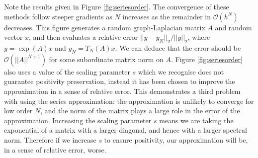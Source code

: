 Note the results given in Figure \ref{fig:seriesorder}. The convergence of these methods follow steeper gradients as $N$ increases as the remainder in $\mathcal{O}(h^N)$ decreases.
This figure generates a random graph-Laplacian matrix $A$ and random vector $x$, and then evaluates a relative error $||y-y_N||_2/||y||_2$,
where $y = \exp(A)x$ and $y_N = T_N(A)x$.
We can deduce that the error should be $\mathcal{O}(||A||^{N+1})$ for some subordinate matrix norm on $A$.
Figure \ref{fig:seriesorder} also uses a value of the scaling parameter $s$ which we recognise does not guarantee positivity preservation,
instead it has been chosen to improve the approximation in a sense of relative error.
This demonstrates a third problem with using the series approximation: the approximation is unlikely to converge for low order $N$,
and the norm of the matrix plays a large role in the error of the approximation.
Increasing the scaling parameter $s$ means we are taking the exponential of a matrix with a larger diagonal, and hence with a larger spectral norm.
Therefore if we increase $s$ to ensure positivity, our approximation will be, in a sense of relative error, worse.

